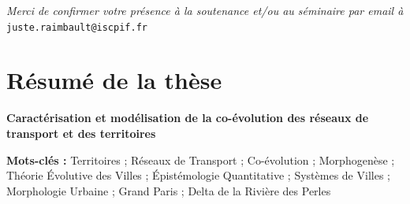 \documentclass[9pt,a4]{article}
\begin{document}
\bigskip
\bigskip

\noindent\textit{Merci de confirmer votre présence à la soutenance et/ou au séminaire par email à }\texttt{juste.raimbault@iscpif.fr}

\newpage

\null
\vfill

\section*{Résumé de la thèse}

\textbf{Caractérisation et modélisation de la co-évolution des réseaux de transport et des territoires}

\bigskip

\noindent\textbf{Mots-clés : } Territoires ; Réseaux de Transport ; Co-évolution ; Morphogenèse ; Théorie Évolutive des Villes ; Épistémologie Quantitative ; Systèmes de Villes ; Morphologie Urbaine ; Grand Paris ; Delta de la Rivière des Perles

\bigskip
\end{document}
